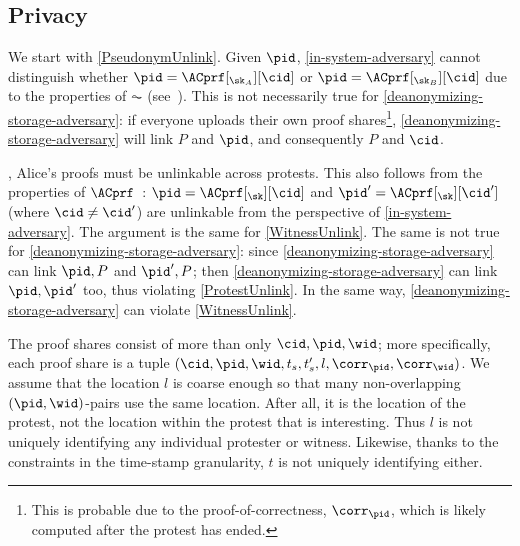 \subsection{Privacy}

We start with \cref{PseudonymUnlink}.
Given \(\pid\), \cref{in-system-adversary} cannot distinguish whether \(\pid = 
  \ACprf[_{\sk_A}][\cid]\) or \(\pid = \ACprf[_{\sk_B}][\cid]\) due to the 
properties of \(\AC\) (see~\cite{HowToWinTheCloneWars}).
This is not necessarily true for \cref{deanonymizing-storage-adversary}:
if everyone uploads their own proof shares\footnote{%
  This is probable due to the proof-of-correctness, \(\corr_\pid\), which is 
  likely computed after the protest has ended.
}, \cref{deanonymizing-storage-adversary} will link \(P\) and \(\pid\), and 
consequently \(P\) and \(\cid\).

, Alice's proofs must be unlinkable across protests.
This also follows from the properties of 
\(\ACprf\)~\cite{HowToWinTheCloneWars}: \(\pid =  \ACprf[_{\sk}][\cid]\) and 
\(\pid' = \ACprf[_{\sk}][\cid']\) (where \(\cid \neq \cid'\)) are unlinkable 
from the perspective of \cref{in-system-adversary}.
The argument is the same for \cref{WitnessUnlink}.
The same is not true for \cref{deanonymizing-storage-adversary}: since 
\cref{deanonymizing-storage-adversary} can link \(\pid, P\) and \(\pid', P\); 
then \cref{deanonymizing-storage-adversary} can link \(\pid, \pid'\) too, thus 
violating \cref{ProtestUnlink}.
In the same way, \cref{deanonymizing-storage-adversary} can violate 
\cref{WitnessUnlink}.

The proof shares consist of more than only \(\cid, \pid, \wid\); more 
specifically, each proof share is a tuple \((\cid, \pid, \wid, t_s, t_s', l, 
  \corr_\pid, \corr_\wid)\).
We assume that the location \(l\) is coarse enough so that many non-overlapping 
\((\pid, \wid)\)-pairs use the same location.
After all, it is the location of the protest, not the location within the 
protest that is interesting.
Thus \(l\) is not uniquely identifying any individual protester or witness.
Likewise, thanks to the constraints in the time-stamp granularity,
\(t\) is not uniquely identifying either.
